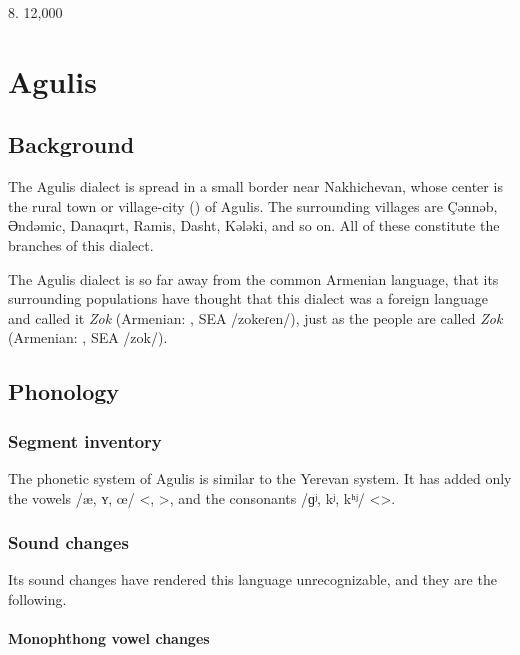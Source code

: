 8.  12,000 


\chapter{Agulis}\label{chapter:Agulis}

 

\section{Background}
\begin{adjarianpage}\label{page:92}\end{adjarianpage}%


The Agulis dialect is spread in a small border near Nakhichevan, whose center is the rural town or village-city () of Agulis. The surrounding villages are Çənnəb, Əndəmic, Danaqırt, Ramis, Dasht, Kələki, and so on. All of these constitute the branches of this dialect. 

The Agulis dialect is so far away from the common Armenian language, that its surrounding populations have thought that this dialect was a foreign language and called it \textit{Zok} (Armenian: , SEA /zokeɾen/), just as the people are called \textit{Zok} (Armenian: , SEA /zok/).

\section{Phonology}
\subsection{Segment inventory}\label{sec:Agulis:phono:segment}

The phonetic system of Agulis is similar to the Yerevan system. It has added only the vowels /æ, ʏ, œ/ <, >, and the consonants /ɡʲ, kʲ, kʰʲ/ <>. 
\subsection{Sound changes}
Its sound changes have rendered this language unrecognizable, and they are the following. 

\subsubsection{Monophthong vowel changes}\label{section:agulis:phono:soundchange:mono}

